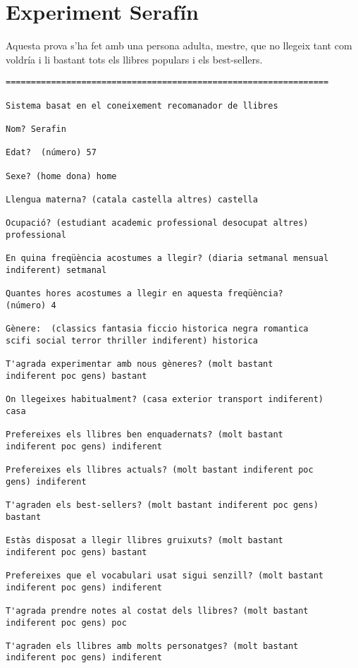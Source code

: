
\section{Experiment Serafín}

Aquesta prova s'ha fet amb una persona adulta, mestre, que no llegeix tant com voldría i li bastant tots els llibres populars i els best-sellers.

\begin{verbatim}
================================================================

Sistema basat en el coneixement recomanador de llibres

Nom? Serafin

Edat?  (número) 57

Sexe? (home dona) home

Llengua materna? (catala castella altres) castella

Ocupació? (estudiant academic professional desocupat altres)
professional

En quina freqüència acostumes a llegir? (diaria setmanal mensual
indiferent) setmanal

Quantes hores acostumes a llegir en aquesta freqüència?
(número) 4

Gènere:  (classics fantasia ficcio historica negra romantica
scifi social terror thriller indiferent) historica

T'agrada experimentar amb nous gèneres? (molt bastant
indiferent poc gens) bastant

On llegeixes habitualment? (casa exterior transport indiferent)
casa

Prefereixes els llibres ben enquadernats? (molt bastant
indiferent poc gens) indiferent

Prefereixes els llibres actuals? (molt bastant indiferent poc
gens) indiferent

T'agraden els best-sellers? (molt bastant indiferent poc gens)
bastant

Estàs disposat a llegir llibres gruixuts? (molt bastant
indiferent poc gens) bastant

Prefereixes que el vocabulari usat sigui senzill? (molt bastant
indiferent poc gens) indiferent

T'agrada prendre notes al costat dels llibres? (molt bastant
indiferent poc gens) poc

T'agraden els llibres amb molts personatges? (molt bastant
indiferent poc gens) indiferent


\end{verbatim}
